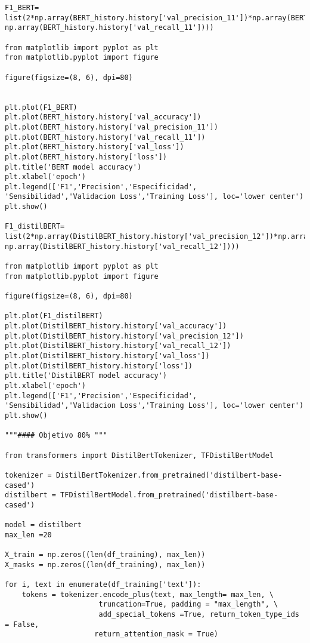 \documentclass[10pt,riqno,a4paper,twoside]{article}\usepackage[]{graphicx}\usepackage[]{color}
\begin{document}
\begin{lstlisting}
F1_BERT= list(2*np.array(BERT_history.history['val_precision_11'])*np.array(BERT_history.history['val_recall_11'])/(np.array(BERT_history.history['val_precision_11'])+ np.array(BERT_history.history['val_recall_11'])))

from matplotlib import pyplot as plt
from matplotlib.pyplot import figure

figure(figsize=(8, 6), dpi=80)


plt.plot(F1_BERT)
plt.plot(BERT_history.history['val_accuracy'])
plt.plot(BERT_history.history['val_precision_11'])
plt.plot(BERT_history.history['val_recall_11'])
plt.plot(BERT_history.history['val_loss'])
plt.plot(BERT_history.history['loss'])
plt.title('BERT model accuracy')
plt.xlabel('epoch')
plt.legend(['F1','Precision','Especificidad', 'Sensibilidad','Validacion Loss','Training Loss'], loc='lower center')
plt.show()

F1_distilBERT= list(2*np.array(DistilBERT_history.history['val_precision_12'])*np.array(DistilBERT_history.history['val_recall_12'])/(np.array(DistilBERT_history.history['val_precision_12'])+ np.array(DistilBERT_history.history['val_recall_12'])))

from matplotlib import pyplot as plt
from matplotlib.pyplot import figure

figure(figsize=(8, 6), dpi=80)

plt.plot(F1_distilBERT)
plt.plot(DistilBERT_history.history['val_accuracy'])
plt.plot(DistilBERT_history.history['val_precision_12'])
plt.plot(DistilBERT_history.history['val_recall_12'])
plt.plot(DistilBERT_history.history['val_loss'])
plt.plot(DistilBERT_history.history['loss'])
plt.title('DistilBERT model accuracy')
plt.xlabel('epoch')
plt.legend(['F1','Precision','Especificidad', 'Sensibilidad','Validacion Loss','Training Loss'], loc='lower center')
plt.show()

"""#### Objetivo 80% """

from transformers import DistilBertTokenizer, TFDistilBertModel

tokenizer = DistilBertTokenizer.from_pretrained('distilbert-base-cased') 
distilbert = TFDistilBertModel.from_pretrained('distilbert-base-cased')

model = distilbert
max_len =20

X_train = np.zeros((len(df_training), max_len))
X_masks = np.zeros((len(df_training), max_len))

for i, text in enumerate(df_training['text']):
    tokens = tokenizer.encode_plus(text, max_length= max_len, \
                      truncation=True, padding = "max_length", \
                      add_special_tokens =True, return_token_type_ids = False,
                     return_attention_mask = True)
    

\end{lstlisting}
\end{document}
